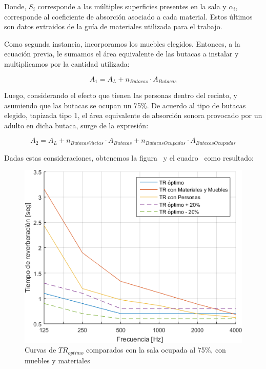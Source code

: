 \par Donde, $S_i$ corresponde a las múltiples superficies presentes en la sala y $\alpha_i$, corresponde al coeficiente de absorción asociado a cada material. Estos últimos son datos extraidos de la guía de materiales utilizada para el trabajo.

\par Como segunda instancia, incorporamos los muebles elegidos. Entonces, a la ecuación previa, le sumamos el área equivalente de las butacas a instalar y multiplicamos por la cantidad  utilizada:

\begin{equation}
    A_1 = A_L + n_{Butacas}\cdot A_{Butacas}
\end{equation}

\par Luego, considerando el efecto que tienen las personas dentro del recinto, y asumiendo que las butacas se ocupan un 75\%. De acuerdo al tipo de butacas elegido, tapizada tipo 1, el área equivalente de absorción sonora provocado por un adulto en dicha butaca, surge de la expresión:

\begin{equation}
    A_2 = A_L + n_{ButacasVacias} \cdot A_{Butacas} + n_{ButacasOcupadas} \cdot A_{ButacasOcupadas}
\end{equation}

\par Dadas estas consideraciones, obtenemos la figura~ y el cuadro~ como resultado:

\begin{figure}[H]
	\centering
	\includegraphics[width=1\textwidth]{./img/TR_conMat_MueblesYPersonas.png}
	\caption{Curvas de $TR_{optimo}$ comparados con la sala ocupada al 75\%, con muebles y materiales}
	\label{fig:TR_conPersonas}
\end{figure}

